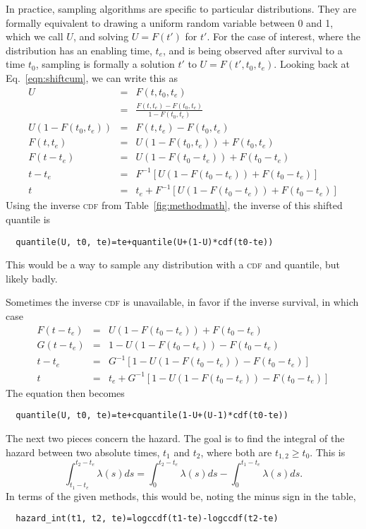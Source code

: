 \documentclass{article}
\begin{document}
In practice, sampling algorithms are specific to particular distributions.
They are formally equivalent to drawing a uniform random variable between
0 and 1, which we call $U$, and solving $U=F(t')$ for $t'$.
For the case of interest, where the distribution has an enabling time, $t_e$,
and is being observed after survival to a time $t_0$, sampling is formally
a solution $t'$ to $U=F(t', t_0, t_e)$. Looking back at Eq.~\ref{eqn:shiftcum},
we can write this as
\begin{eqnarray}
 U&=&F(t,t_0,t_e) \\
  &=&\frac{F(t,t_e)-F(t_0,t_e)}{1-F(t_0,t_e)} \\
U(1-F(t_0,t_e))&=&F(t,t_e)-F(t_0,t_e) \\
F(t,t_e)&=&U(1-F(t_0,t_e))+F(t_0,t_e) \\
F(t-t_e)&=&U(1-F(t_0-t_e))+F(t_0-t_e) \\
t-t_e &=& F^{-1}\left[U(1-F(t_0-t_e))+F(t_0-t_e)\right] \\
t &=& t_e+F^{-1}\left[U(1-F(t_0-t_e))+F(t_0-t_e)\right]
\end{eqnarray}
Using the inverse \textsc{cdf} from Table~\ref{fig:methodmath},
the inverse of this shifted quantile is
\begin{lstlisting}
  quantile(U, t0, te)=te+quantile(U+(1-U)*cdf(t0-te))
\end{lstlisting}
This would be a way to sample any distribution with a \textsc{cdf} and
quantile, but likely badly.

Sometimes the inverse \textsc{cdf} is unavailable, in favor if the
inverse survival, in which case
\begin{eqnarray}
F(t-t_e)&=&U(1-F(t_0-t_e))+F(t_0-t_e) \\
G(t-t_e)&=&1-U(1-F(t_0-t_e))-F(t_0-t_e) \\
t-t_e &=& G^{-1}\left[1-U(1-F(t_0-t_e))-F(t_0-t_e)\right] \\
t &=& t_e+G^{-1}\left[1-U(1-F(t_0-t_e))-F(t_0-t_e)\right]
\end{eqnarray}
The equation then becomes
\begin{lstlisting}
  quantile(U, t0, te)=te+cquantile(1-U+(U-1)*cdf(t0-te))
\end{lstlisting}

The next two pieces concern the hazard. The goal is to find the integral
of the hazard between two absolute times, $t_1$ and $t_2$, where both
are $t_{1,2}\ge t_0$. This is
\begin{equation}
  \int_{t_1-t_e}^{t_2-t_e} \lambda(s)ds=\int_{0}^{t_2-t_e} \lambda(s)ds
  	-\int_{0}^{t_1-t_e} \lambda(s)ds.
\end{equation}
In terms of the given methods, this would be, noting the minus sign
in the table,
\begin{lstlisting}
  hazard_int(t1, t2, te)=logccdf(t1-te)-logccdf(t2-te)
\end{lstlisting}
\end{document}
